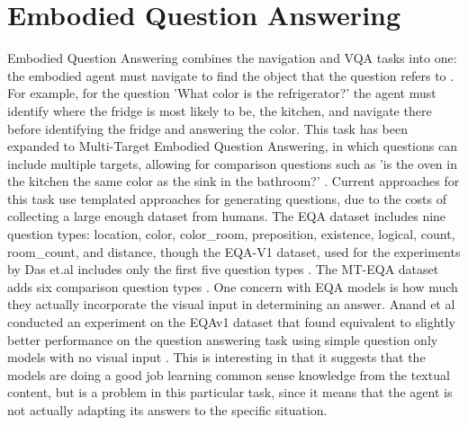 \section{Embodied Question Answering}
Embodied Question Answering combines the navigation and VQA tasks into one: the embodied agent must navigate to find the object that the question refers to \cite{embodiedqa}. For example, for the question 'What color is the refrigerator?' the agent must identify where the fridge is most likely to be, the kitchen, and navigate there before identifying the fridge and answering the color. This task has been expanded to Multi-Target Embodied Question Answering, in which questions can include multiple targets, allowing for comparison questions such as 'is the oven in the kitchen the same color as the sink in the bathroom?' \cite{eqa_multitarget}. Current approaches for this task use templated approaches for generating questions, due to the costs of collecting a large enough dataset from humans.  %
The EQA dataset includes nine question types: location, color, color\_room, preposition, existence, logical, count, room\_count, and distance, though the EQA-V1 dataset, used for the experiments by Das et.al includes only the first five question types \cite{embodiedqa}. The MT-EQA dataset adds six comparison question types \cite{eqa_multitarget}. \newline
One concern with EQA models is how much they actually incorporate the visual input in determining an answer. Anand et al conducted an experiment on the EQAv1 dataset that found equivalent to slightly better performance on the question answering task using simple question only models with no visual input \cite{blindfolded}. This is interesting in that it suggests that the models are doing a good job learning common sense knowledge from the textual content, but is a problem in this particular task, since it means that the agent is not actually adapting its answers to the specific situation. \newline
